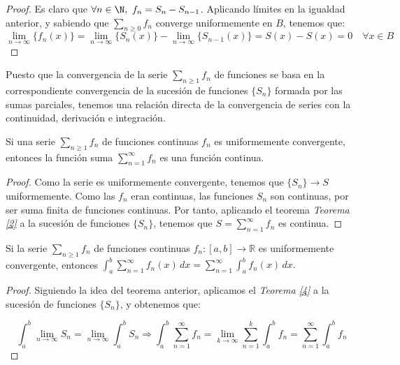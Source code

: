   \begin{proof}
    Es claro que $\forall n \in \N,\ f_n = S_{n} - S_{n-1}$. Aplicando límites en la igualdad anterior, y sabiendo que $\sum_{n\ge 0} f_n$ converge uniformemente en $B$, tenemos que:
    $$\lim_{n \to \infty} \{f_n(x)\} = \lim_{n \to \infty} \{S_n(x)\} - \lim_{n \to \infty} \{S_{n - 1}(x)\} = S(x) - S(x) = 0\quad \forall x \in B$$
  \end{proof}

Puesto que  la convergencia de la serie $\sum_{n\geq 1} f_n$ de funciones se basa en la correspondiente convergencia de la sucesi\'on de funciones $\{S_n\}$ formada por las sumas parciales, tenemos una relación directa de la convergencia de series con la continuidad, derivación e integración.


\begin{nth} \label{7}
  Si una serie  $\sum_{n\geq 1} f_n $ de funciones continuas $f_n$ es uniformemente convergente, entonces la funci\'on suma $\displaystyle \sum_{n=1}^{\infty} f_n $ es una funci\'on continua.
\end{nth}

  \begin{proof}
    Como la serie es uniformemente convergente, tenemos que $\{S_n\} \to S$ uniformemente. Como las $f_n$ eran continuas, las funciones $S_n$ son continuas, por ser suma finita de funciones continuas. Por tanto, aplicando el teorema \textit{Teorema \ref{2}} a la sucesión de funciones $\{S_n\}$, tenemos que $S = \sum_{n=1}^{\infty} f_n$ es continua.
  \end{proof}


\begin{nth} \label{8}
  Si la serie $\sum_{n\geq 1} f_n $ de funciones continuas $f_n:[a,b]\longrightarrow \mathbb R$ es uniformemente convergente, entonces
  $
  \displaystyle \int_a^b \sum_{n=1}^{\infty} f_n (x) \, dx =  \sum_{n=1}^{\infty} \int_a^b f_n (x) \, dx  .
  $
\end{nth}

  \begin{proof}
    Siguiendo la idea del teorema anterior, aplicamos el \textit{Teorema \ref{4}} a la sucesión de funciones $\{S_n\}$, y obtenemos que:

    $$\int_a^b \lim_{n \to \infty} S_n = \lim_{n \to \infty} \int_a^b S_n \Rightarrow \int_a^b \sum_{n=1}^{\infty} f_n = \lim_{k \to \infty} \sum_{n=1}^k \int_a^b f_n = \sum_{n =1}^{\infty} \int_a^b f_n$$
  \end{proof}



